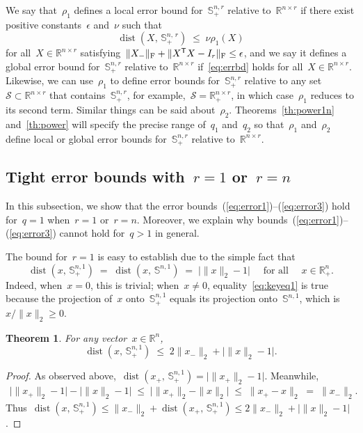 \documentclass[11pt,a4paper]{article}  %
\newtheorem{theorem}{Theorem}%
\theoremstyle{definition}
\DeclareMathOperator{\dist}{dist}
\newcommand{\RR}{\mathbb{R}}
\newcommand{\sset}{\mathcal{S}}
\newcommand{\res}{\rho}
\newcommand{\col}{r}
\newcommand{\stf}[1]{\mathbb{S}^{#1}}
\newcommand{\fro}{{\scriptstyle{\textnormal{F}}}}
\newcommand{\trs}{{\scriptstyle{\mathsf{T}}}}
\begin{document}
We say that~$\res_1$ defines a local error bound for~$\stf{n,\col}_+$ relative
to~$\RR^{n\times\col}$ if there exist positive constants~$\epsilon$ and~$\nu$ such that
\begin{equation}
    \label{eq:errbd}
    \dist(X,\, \stf{n,\,\col}_+) \;\le\; \nu \res_1(X)
\end{equation}
for all~$X\in \RR^{n\times \col}$ satisfying~$\|X_{-}\|_\fro+\|X^\trs X-I_{\col}\|_\fro\le \epsilon$,
and we say it defines a global error bound for~$\stf{n,\col}_+$ relative to~$\RR^{n\times\col}$
if~\eqref{eq:errbd} holds for all~$X\in\RR^{n\times \col}$.
Likewise, we can use~$\res_1$ to define error bounds for~$\stf{n,\col}_+$ relative to
any set~$\sset\subset\RR^{n\times\col}$ that contains~$\stf{n, \col}_+$, for
example,~$\sset = \RR^{n\times\col}_+$, in which case~$\res_1$ reduces to its second term.
Similar things can be said about~$\res_2$.
Theorems~\ref{th:power1n} and~\ref{th:power}
will specify the precise range of~$q_1$ and~$q_2$ so that~$\res_1$ and~$\res_2$ define local or
global error bounds for~$\stf{n,\col}_+$ relative to~$\RR^{n\times \col}$.


\subsection{Tight error bounds with~$\col =  1$ or~$\col = n$}
\label{ssec:errbd1n}

In this subsection, we show that the error bounds~(\ref{eq:error1})--(\ref{eq:error3}) hold for~$q=1$
when~$\col=1$ or~$\col=n$. Moreover, we explain why
bounds~(\ref{eq:error1})--(\ref{eq:error3}) cannot hold for~$q>1$ in general.

The bound for~$\col = 1$ is easy to establish due to the simple fact that
\begin{equation}
     \label{eq:keyeq1}
        \dist(x,\,\stf{n,1}_+) \;=\;  \dist(x,\,\stf{n,1}) \;=\;  \big|\|x\|_2 - 1\big|
        \quad \text{ for all } \quad x\in\RR^{n}_+.
\end{equation}
Indeed, when~$x = 0$, this is trivial; when~$x\neq 0$, equality~\eqref{eq:keyeq1} is true
because the projection of~$x$ onto~$\stf{n,1}_+$ equals its projection onto~$\stf{n,1}$, which
is~$x/\|x\|_2 \ge 0$.
\begin{theorem}%
    \label{th:gerrbdr1}
    For any vector~$x\in\RR^{n}$,
\[
    \dist(x,\, \stf{n,1}_+)  \;\le\;  2\|x_{-}\|_2 + \big|\|x\|_2 - 1\big|.
\]
\end{theorem}
\begin{proof}
    As observed above,~$\dist(x_+,\,\stf{n,1}_+) = \big| \|x_+\|_2-1\big |$.
    Meanwhile,
    \begin{equation}
        \nonumber
        \begin{split}
        \big|\|x_{+}\|_2-1\big| - \big|\|x\|_2-1\big|
        \;\le\; \big|\|x_{+}\|_2 - \|x\|_2\big|
        \;\le\; \|x_{+}- x\|_2
        \;=\; \|x_{-}\|_2.
        \end{split}
    \end{equation}
    Thus~$\dist(x,\, \stf{n,1}_+)  \le\|x_{-}\|_2+ \dist(x_+,\, \stf{n,1}_+) \le  2\|x_{-}\|_2 + \big|\|x\|_2 - 1\big|$.
\end{proof}
\end{document}
